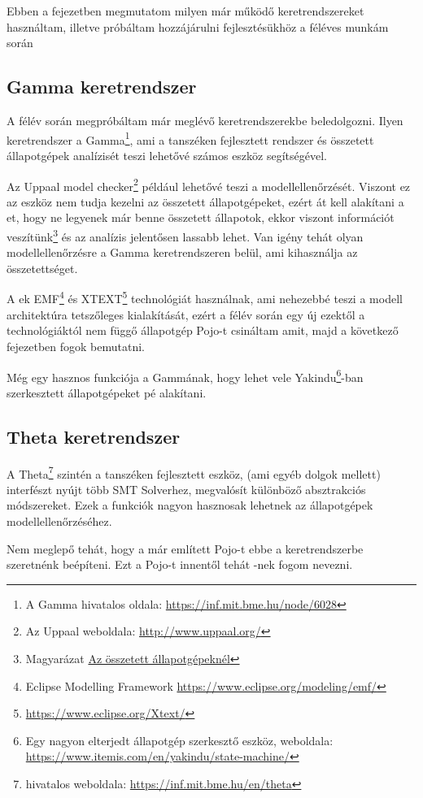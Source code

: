 \chapter{\architecture}
\label{sec:archiutecture}

Ebben a fejezetben megmutatom milyen már működő keretrendszereket használtam, illetve próbáltam hozzájárulni fejlesztésükhöz a féléves munkám során

\section{Gamma keretrendszer}
A félév során megpróbáltam már meglévő keretrendszerekbe beledolgozni. Ilyen keretrendszer a Gamma\footnote{A Gamma hivatalos oldala: \url{https://inf.mit.bme.hu/node/6028}}, ami a tanszéken fejlesztett rendszer és összetett állapotgépek analízisét teszi lehetővé számos eszköz segítségével.

Az Uppaal model checker\footnote{Az Uppaal weboldala: \url{http://www.uppaal.org/}} például lehetővé teszi a {\gammaSc} modellellenőrzését. Viszont ez az eszköz nem tudja kezelni az összetett állapotgépeket, ezért át kell alakítani a {\gammaSc}et, hogy ne legyenek már benne összetett állapotok, ekkor viszont információt veszítünk\footnote{Magyarázat \hyperref[infovesztes]{Az összetett állapotgépeknél}} és az analízis jelentősen lassabb lehet. Van igény tehát olyan modellellenőrzésre a Gamma keretrendszeren belül, ami kihasználja az összetettséget.

A {\gammaSc}ek EMF\footnote{Eclipse Modelling Framework \url{https://www.eclipse.org/modeling/emf/}} és XTEXT\footnote{\url{https://www.eclipse.org/Xtext/}} technológiát használnak, ami nehezebbé teszi a modell architektúra tetszőleges kialakítását, ezért a félév során egy új ezektől a technológiáktól nem függő állapotgép Pojo-t csináltam amit, majd a következő fejezetben fogok bemutatni.

Még egy hasznos funkciója a Gammának, hogy lehet vele Yakindu\footnote{Egy nagyon elterjedt állapotgép szerkesztő eszköz, weboldala: \url{https://www.itemis.com/en/yakindu/state-machine/}}-ban szerkesztett állapotgépeket {\gammaSc}pé alakítani.


\section{Theta keretrendszer}

A Theta\footnote{hivatalos weboldala: \url{https://inf.mit.bme.hu/en/theta}} szintén a tanszéken fejlesztett eszköz, (ami egyéb dolgok mellett) interfészt nyújt több SMT Solverhez, megvalósít különböző absztrakciós módszereket. Ezek a funkciók nagyon hasznosak lehetnek az állapotgépek modellellenőrzéséhez.

Nem meglepő tehát, hogy a már említett Pojo-t ebbe a keretrendszerbe szeretnénk beépíteni. Ezt a Pojo-t innentől tehát {\thetaSc}-nek fogom nevezni. 